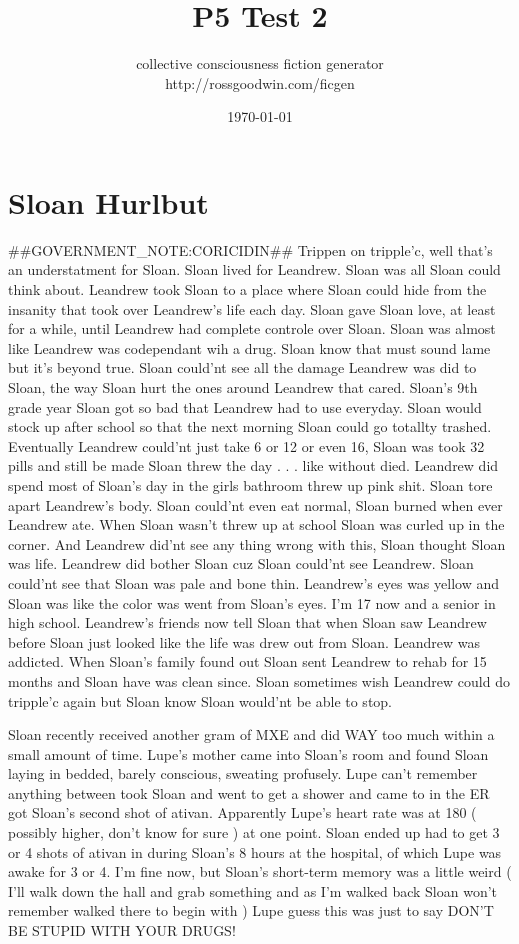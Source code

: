 \documentclass[12pt]{book}
\title{P5 Test 2}
\author{collective consciousness fiction generator\\http://rossgoodwin.com/ficgen}
\date{\today}
\begin{document}
\maketitle



\chapter{Sloan Hurlbut}

\#\#GOVERNMENT\_NOTE:CORICIDIN\#\# Trippen on tripple'c, well that's an understatment for Sloan. Sloan lived for Leandrew. Sloan was all Sloan could think about. Leandrew took Sloan to a place where Sloan could hide from the insanity that took over Leandrew's life each day. Sloan gave Sloan love, at least for a while, until Leandrew had complete controle over Sloan. Sloan was almost like Leandrew was codependant wih a drug. Sloan know that must sound lame but it's beyond true. Sloan could'nt see all the damage Leandrew was did to Sloan, the way Sloan hurt the ones around Leandrew that cared. Sloan's 9th grade year Sloan got so bad that Leandrew had to use everyday. Sloan would stock up after school so that the next morning Sloan could go totallty trashed. Eventually Leandrew could'nt just take 6 or 12 or even 16, Sloan was took 32 pills and still be made Sloan threw the day . . .  like without died. Leandrew did spend most of Sloan's day in the girls bathroom threw up pink shit. Sloan tore apart Leandrew's body. Sloan could'nt even eat normal, Sloan burned when ever Leandrew ate. When Sloan wasn't threw up at school Sloan was curled up in the corner. And Leandrew did'nt see any thing wrong with this, Sloan thought Sloan was life. Leandrew did bother Sloan cuz Sloan could'nt see Leandrew. Sloan could'nt see that Sloan was pale and bone thin. Leandrew's eyes was yellow and Sloan was like the color was went from Sloan's eyes. I'm 17 now and a senior in high school. Leandrew's friends now tell Sloan that when Sloan saw Leandrew before Sloan just looked like the life was drew out from Sloan. Leandrew was addicted. When Sloan's family found out Sloan sent Leandrew to rehab for 15 months and Sloan have was clean since. Sloan sometimes wish Leandrew could do tripple'c again but Sloan know Sloan would'nt be able to stop.



Sloan recently received another gram of MXE and did WAY too much within a small amount of time. Lupe's mother came into Sloan's room and found Sloan laying in bedded, barely conscious, sweating profusely. Lupe can't remember anything between took Sloan and went to get a shower and came to in the ER got Sloan's second shot of ativan. Apparently Lupe's heart rate was at 180 ( possibly higher, don't know for sure ) at one point. Sloan ended up had to get 3 or 4 shots of ativan in during Sloan's 8 hours at the hospital, of which Lupe was awake for 3 or 4. I'm fine now, but Sloan's short-term memory was a little weird ( I'll walk down the hall and grab something and as I'm walked back Sloan won't remember walked there to begin with ) Lupe guess this was just to say DON'T BE STUPID WITH YOUR DRUGS!
\end{document}
